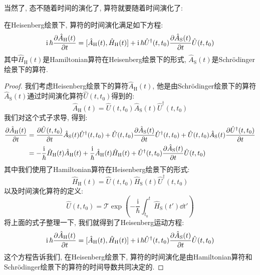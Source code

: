 当然了, 态不随着时间的演化了, 算符就要随着时间演化了:
\begin{theorem}[][Heisenberg运动方程]
  在Heisenberg绘景下, 算符的时间演化满足如下方程:
  \begin{equation}
    \mathrm{i}\, \hbar \pdv{\hat{A}_{\text{H}}(t)}{t} = [\hat{A}_{\text{H}}(t), \hat{H}_{\text{H}}(t)] + \mathrm{i}\,\hbar \hat{U}^\dagger(t,t_0) \pdv{\hat{A}_{\text{S}}(t)}{t} \hat{U}(t,t_0)
  \end{equation}
  其中$\hat{H}_{\text{H}}(t)$是Hamiltonian算符在Heisenberg绘景下的形式, $\hat{A}_{\text{S}}(t)$是Schrödinger绘景下的算符.
\end{theorem}
\begin{proof}
  我们考虑Heisenberg绘景下的算符$\hat{A}_{\text{H}}(t)$, 他是由Schrödinger绘景下的算符$\hat{A}_{\text{S}}(t)$通过时间演化算符$\hat{U}(t,t_0)$得到的:
  \begin{equation}
    \hat{A}_{\text{H}}(t) = \hat{U}(t,t_0) \hat{A}_{\text{S}}(t) \hat{U}^\dagger(t,t_0)
  \end{equation}
  我们对这个式子求导, 得到:
  \begin{align}
    \pdv{\hat{A}_{\text{H}}(t)}{t} &= \pdv{\hat{U}(t,t_0)}{t} \hat{A}_{\text{S}}(t) \hat{U}^\dagger(t,t_0) + \hat{U}(t,t_0) \pdv{\hat{A}_{\text{S}}(t)}{t} \hat{U}^\dagger(t,t_0) + \hat{U}(t,t_0) \hat{A}_{\text{S}}(t) \pdv{\hat{U}^\dagger(t,t_0)}{t} \\
    &= -\frac{\mathrm{i}}{\hbar} \hat{H}_{\text{H}}(t) \hat{A}_{\text{H}}(t) + \frac{\mathrm{i}}{\hbar} \hat{A}_{\text{H}}(t) \hat{H}_{\text{H}}(t) + \hat{U}^\dagger(t,t_0) \pdv{\hat{A}_{\text{S}}(t)}{t} \hat{U}(t,t_0)
  \end{align}
  其中我们使用了Hamiltonian算符在Heisenberg绘景下的形式:
  \begin{equation}
    \hat{H}_{\text{H}}(t) = \hat{U}(t,t_0) \hat{H}_{\text{S}}(t) \hat{U}^\dagger(t,t_0)
  \end{equation}
  以及时间演化算符的定义:
  \begin{equation}
    \hat{U}(t,t_0) = \mathcal{T} \exp\left( -\frac{\mathrm{i}}{\hbar} \int_{t_0}^{t} \hat{H}_{\text{S}}(t') \dd{t'} \right)
  \end{equation}
  将上面的式子整理一下, 我们就得到了Heisenberg运动方程:
  \begin{equation}
    \mathrm{i}\, \hbar \pdv{\hat{A}_{\text{H}}(t)}{t} = [\hat{A}_{\text{H}}(t), \hat{H}_{\text{H}}(t)] + \mathrm{i}\,\hbar \hat{U}^\dagger(t,t_0) \pdv{\hat{A}_{\text{S}}(t)}{t} \hat{U}(t,t_0)
  \end{equation}
  这个方程告诉我们, 在Heisenberg绘景下, 算符的时间演化是由Hamiltonian算符和Schrödinger绘景下的算符的时间导数共同决定的.
\end{proof}


